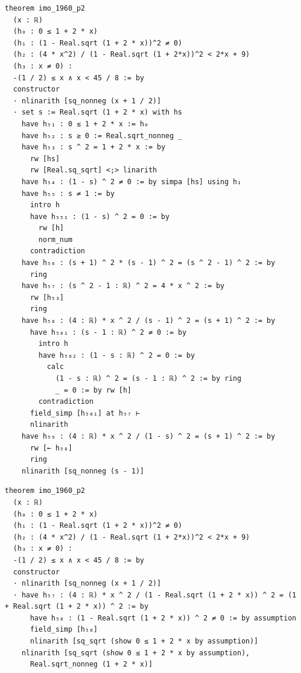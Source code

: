 \begin{tcolorbox}[colback=lightblue, boxrule=0pt, arc=5pt, outer arc=5pt, after skip=10pt plus 2pt]
\begin{minipage}[t]{0.99\textwidth}
\begin{lstlisting}[caption={Original Proof (Length 330)}, language=lean, breaklines=true, style=mystyletiny]
theorem imo_1960_p2
  (x : ℝ)
  (h₀ : 0 ≤ 1 + 2 * x)
  (h₁ : (1 - Real.sqrt (1 + 2 * x))^2 ≠ 0)
  (h₂ : (4 * x^2) / (1 - Real.sqrt (1 + 2*x))^2 < 2*x + 9)
  (h₃ : x ≠ 0) :
  -(1 / 2) ≤ x ∧ x < 45 / 8 := by
  constructor
  · nlinarith [sq_nonneg (x + 1 / 2)]
  · set s := Real.sqrt (1 + 2 * x) with hs
    have h₅₁ : 0 ≤ 1 + 2 * x := h₀
    have h₅₂ : s ≥ 0 := Real.sqrt_nonneg _
    have h₅₃ : s ^ 2 = 1 + 2 * x := by
      rw [hs]
      rw [Real.sq_sqrt] <;> linarith
    have h₅₄ : (1 - s) ^ 2 ≠ 0 := by simpa [hs] using h₁
    have h₅₅ : s ≠ 1 := by
      intro h
      have h₅₅₁ : (1 - s) ^ 2 = 0 := by
        rw [h]
        norm_num
      contradiction
    have h₅₆ : (s + 1) ^ 2 * (s - 1) ^ 2 = (s ^ 2 - 1) ^ 2 := by
      ring
    have h₅₇ : (s ^ 2 - 1 : ℝ) ^ 2 = 4 * x ^ 2 := by
      rw [h₅₃]
      ring
    have h₅₈ : (4 : ℝ) * x ^ 2 / (s - 1) ^ 2 = (s + 1) ^ 2 := by
      have h₅₈₁ : (s - 1 : ℝ) ^ 2 ≠ 0 := by
        intro h
        have h₅₈₂ : (1 - s : ℝ) ^ 2 = 0 := by
          calc
            (1 - s : ℝ) ^ 2 = (s - 1 : ℝ) ^ 2 := by ring
            _ = 0 := by rw [h]
        contradiction
      field_simp [h₅₈₁] at h₅₇ ⊢
      nlinarith
    have h₅₉ : (4 : ℝ) * x ^ 2 / (1 - s) ^ 2 = (s + 1) ^ 2 := by
      rw [← h₅₈]
      ring
    nlinarith [sq_nonneg (s - 1)]
\end{lstlisting}
\end{minipage}
\begin{minipage}[t]{0.99\textwidth}
\begin{lstlisting}[caption={Simplified Proof (Length 125)}, language=lean, breaklines=true, style=mystyle]
theorem imo_1960_p2
  (x : ℝ)
  (h₀ : 0 ≤ 1 + 2 * x)
  (h₁ : (1 - Real.sqrt (1 + 2 * x))^2 ≠ 0)
  (h₂ : (4 * x^2) / (1 - Real.sqrt (1 + 2*x))^2 < 2*x + 9)
  (h₃ : x ≠ 0) :
  -(1 / 2) ≤ x ∧ x < 45 / 8 := by
  constructor
  · nlinarith [sq_nonneg (x + 1 / 2)]
  · have h₅₇ : (4 : ℝ) * x ^ 2 / (1 - Real.sqrt (1 + 2 * x)) ^ 2 = (1 + Real.sqrt (1 + 2 * x)) ^ 2 := by
      have h₅₈ : (1 - Real.sqrt (1 + 2 * x)) ^ 2 ≠ 0 := by assumption
      field_simp [h₅₈]
      nlinarith [sq_sqrt (show 0 ≤ 1 + 2 * x by assumption)]
    nlinarith [sq_sqrt (show 0 ≤ 1 + 2 * x by assumption),
      Real.sqrt_nonneg (1 + 2 * x)]
\end{lstlisting}
\end{minipage}
\end{tcolorbox}


